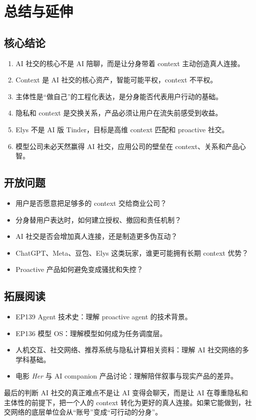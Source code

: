 \section{总结与延伸}

\subsection{核心结论}

\begin{enumerate}
\item AI 社交的核心不是 AI 陪聊，而是让分身带着 context 主动创造真人连接。
\item Context 是 AI 社交的核心资产，智能可能平权，context 不平权。
\item 主体性是“做自己”的工程化表达，是分身能否代表用户行动的基础。
\item 隐私和 context 是交换关系，产品必须让用户在流失前感受到收益。
\item Elys 不是 AI 版 Tinder，目标是高维 context 匹配和 proactive 社交。
\item 模型公司未必天然赢得 AI 社交，应用公司的壁垒在 context、关系和产品心智。
\end{enumerate}

\subsection{开放问题}

\begin{itemize}
\item 用户是否愿意把足够多的 context 交给商业公司？
\item 分身替用户表达时，如何建立授权、撤回和责任机制？
\item AI 社交是否会增加真人连接，还是制造更多伪互动？
\item ChatGPT、Meta、豆包、Elys 这类玩家，谁更可能拥有长期 context 优势？
\item Proactive 产品如何避免变成骚扰和失控？
\end{itemize}

\subsection{拓展阅读}

\begin{itemize}
\item EP139 Agent 技术史：理解 proactive agent 的技术背景。
\item EP136 模型 OS：理解模型如何成为任务调度层。
\item 人机交互、社交网络、推荐系统与隐私计算相关资料：理解 AI 社交网络的多学科基础。
\item 电影 \textit{Her} 与 AI companion 产品讨论：理解陪伴叙事与现实产品的差异。
\end{itemize}

\begin{importantbox}{最后的判断}
AI 社交的真正难点不是让 AI 变得会聊天，而是让 AI 在尊重隐私和主体性的前提下，把一个人的 context 转化为更好的真人连接。如果它能做到，社交网络的底层单位会从“账号”变成“可行动的分身”。\end{importantbox}


